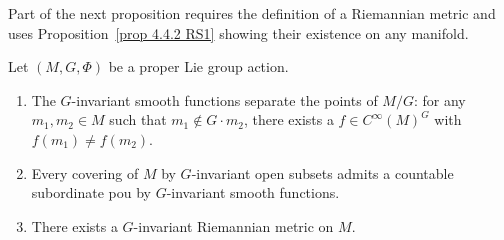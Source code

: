 Part of the next proposition requires the definition of a Riemannian metric and uses Proposition~\ref{prop 4.4.2 RS1} showing their existence on any manifold.

\begin{prop}[{{\cite[Prop.~6.3.7]{RS1}}}]\label{prop 6.3.7 RS1}
    Let $(M,G,\Phi)$ be a proper Lie group action.
    \begin{enumerate}
        \item The $G$-invariant smooth functions separate the points of $M\slash G$: for any $m_1,m_2\in M$ such that $m_1\notin G\cdot m_2$, there exists a $f\in C^\infty(M)^G$ with $f(m_1)\neq f(m_2)$.
        \item Every covering of $M$ by $G$-invariant open subsets admits a countable subordinate \gls{pou} by $G$-invariant smooth functions.
        \item There exists a $G$-invariant Riemannian metric on $M$.
    \end{enumerate}
\end{prop}

